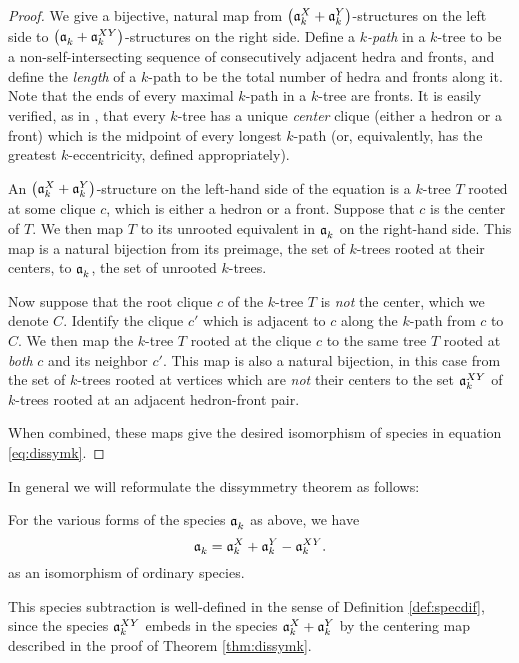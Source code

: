 \documentclass[distribution,draft]{brandiss} %
\numberwithin{section}{chapter}
\numberwithin{figure}{chapter}
\begin{document}
\begin{proof}
  We give a bijective, natural map from $\left( {\mathfrak{a}_{k}^{X} + \mathfrak{a}_{k}^{Y}} \right)$-structures on the left side to $\left( {\mathfrak{a}_{k}^{} + \mathfrak{a}_{k}^{XY}} \right)$-structures on the right side.
  Define a \emph{$k$-path} in a $k$-tree to be a non-self-intersecting sequence of consecutively adjacent hedra and fronts, and define the \emph{length} of a $k$-path to be the total number of hedra and fronts along it.
  Note that the ends of every maximal $k$-path in a $k$-tree are fronts.
  It is easily verified, as in \cite{kob:ktlogspace}, that every $k$-tree has a unique \emph{center} clique (either a hedron or a front) which is the midpoint of every longest $k$-path (or, equivalently, has the greatest $k$-eccentricity, defined appropriately).
  
  An $\left( {\mathfrak{a}_{k}^{X} + \mathfrak{a}_{k}^{Y}} \right)$-structure on the left-hand side of the equation is a $k$-tree $T$ rooted at some clique $c$, which is either a hedron or a front.
  Suppose that $c$ is the center of $T$.
  We then map $T$ to its unrooted equivalent in $\mathfrak{a}_{k}^{}$ on the right-hand side.
  This map is a natural bijection from its preimage, the set of $k$-trees rooted at their centers, to $\mathfrak{a}_{k}^{}$, the set of unrooted $k$-trees.

  Now suppose that the root clique $c$ of the $k$-tree $T$ is \emph{not} the center, which we denote $C$.
  Identify the clique $c'$ which is adjacent to $c$ along the $k$-path from $c$ to $C$.
  We then map the $k$-tree $T$ rooted at the clique $c$ to the same tree $T$ rooted at \emph{both} $c$ and its neighbor $c'$.
  This map is also a natural bijection, in this case from the set of $k$-trees rooted at vertices which are \emph{not} their centers to the set $\mathfrak{a}_{k}^{XY}$ of $k$-trees rooted at an adjacent hedron-front pair.

  When combined, these maps give the desired isomorphism of species in equation \eqref{eq:dissymk}.
\end{proof}

In general we will reformulate the dissymmetry theorem as follows:
\begin{corollary}
  \label{cor:dissymkreform}
  For the various forms of the species $\mathfrak{a}_{k}^{}$ as above, we have
  \begin{equation}
    \label{eq:dissymkreform}
    \mathfrak{a}_{k}^{} = \mathfrak{a}_{k}^{X} + \mathfrak{a}_{k}^{Y} - \mathfrak{a}_{k}^{XY}.
  \end{equation}
  as an isomorphism of ordinary species.
\end{corollary}

This species subtraction is well-defined in the sense of Definition \ref{def:specdif}, since the species $\mathfrak{a}_{k}^{XY}$ embeds in the species $\mathfrak{a}_{k}^{X} + \mathfrak{a}_{k}^{Y}$ by the centering map described in the proof of Theorem \ref{thm:dissymk}.
\end{document}
